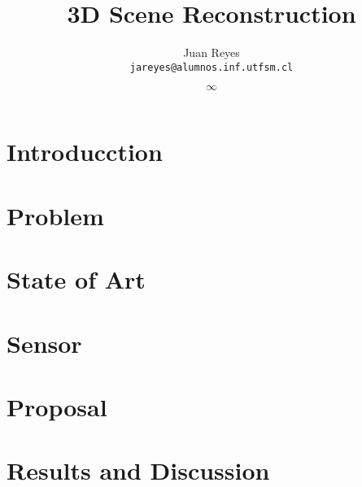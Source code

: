 \documentclass[spanish,english,12pt,letterpaper,oneside]{book}
\title{3D Scene Reconstruction}
\author{
  Juan Reyes \\ \texttt{jareyes@alumnos.inf.utfsm.cl}
}
\date{$\infty$}
\begin{document}
\frontmatter




\tableofcontents

{}
\listoffigures
{}
\listoftables

\mainmatter

\chapter{Introducction}
\label{introduccion}


\chapter{Problem}


\chapter{State of Art}


\chapter{Sensor}


\chapter{Proposal}








\chapter{Results and Discussion}

%

\end{document}
